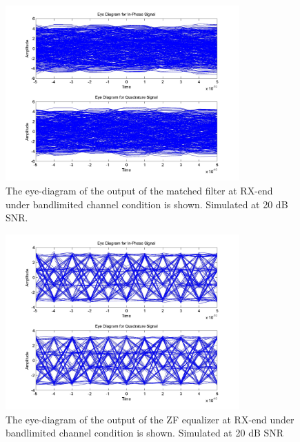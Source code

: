 \documentclass[]{article}
\begin{document}
\begin{figure}[H]
\centering
\includegraphics[width=0.8\textwidth]{matched_eye_16qam20.jpg}
\caption{The eye-diagram of the output of the matched filter at RX-end under bandlimited channel condition is shown. Simulated at 20 dB SNR. \label{fig:qamEyeMatch}}
\end{figure}

\begin{figure}[H]
\centering
\includegraphics[width=0.8\textwidth]{equalized_eye_qam20.jpg}
\caption{The eye-diagram of the output of the ZF equalizer at RX-end under bandlimited channel condition is shown. Simulated at 20 dB SNR \label{fig:qamEyeEqu}}
\end{figure}
\end{document}
